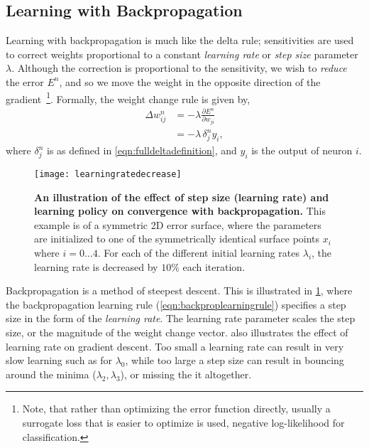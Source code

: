 \documentclass[thesis]{subfiles}
\begin{document}
\subsection{Learning with Backpropagation}
Learning with backpropagation is much like the delta rule; sensitivities are used to correct weights proportional to a constant \emph{learning rate} or \emph{step size} parameter $\lambda$. Although the correction is proportional to the sensitivity, we wish to \emph{reduce} the error $E^n$, and so we move the weight in the opposite direction of the gradient~\footnote{Note, that rather than optimizing the error function directly, usually a surrogate loss that is easier to optimize is used, \ie negative log-likelihood for classification.}. Formally, the weight change rule is given by,
\begin{equation}
\begin{aligned}
    \Delta w^n_{ij} &= -\lambda \frac{\partial E^n}{\partial w_{ji}}\\
    &= -\lambda \, \delta^n_j y_i,
     \label{eqn:backproplearningrule}
\end{aligned}
\end{equation}
where $\delta^n_j$ is as defined in \cref{eqn:fulldeltadefinition}, and $y_i$ is the output of neuron $i$.
%
\begin{figure}[tbp]
\centering
\texttt{[image: learningratedecrease]}
\caption[Learning rate and convergence]{\textbf{An illustration of the effect of step size (learning rate) and learning policy on convergence with backpropagation.} This example is of a symmetric 2D error surface, where the parameters are initialized to one of the symmetrically identical surface points $x_i$ where $i=0\ldots4$. For each of the different initial learning rates $\lambda_i$, the learning rate is decreased by $10\%$ each iteration.}\label{fig:learningrate}
\end{figure}
Backpropagation is a method of steepest descent. This is illustrated in \cref{fig:learningrate}, where the backpropagation learning rule (\cref{eqn:backproplearningrule}) specifies a step size in the form of the \emph{learning rate}. The learning rate parameter scales the step size, or the magnitude of the weight change vector.  also illustrates the effect of learning rate on gradient descent. Too small a learning rate can result in very slow learning such as for $\lambda_0$, while too large a step size can result in bouncing around the minima ($\lambda_2, \lambda_3$), or missing the it altogether. 
\end{document}
